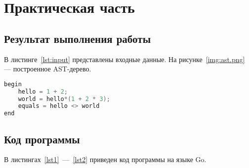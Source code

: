 \section{Практическая часть}

\subsection{Результат выполнения работы}

В листинге~\ref{lst:input} представлены входные данные. На рисунке~\ref{img:ast.png} --- построенное AST-дерево.

\begin{lstlisting}[language=Go, caption={Входная программа}, label=lst:input]
begin
    hello = 1 + 2;
    world = hello*(1 + 2 * 3);
    equals = hello <> world
end
\end{lstlisting}


\subsection{Код программы}

В листингах~\ref{lst1}~---~\ref{lst2} приведен код программы на языке Go.

